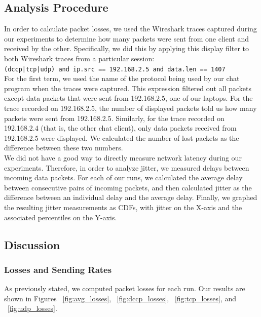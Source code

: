 \documentclass[9pt,twocolumn]{article}
\begin{document}
\subsection{Analysis Procedure}

In order to calculate packet losses, we used the Wireshark traces captured
during our experiments to determine how many packets were sent from one client
and received by the other. Specifically, we did this by applying this display
filter to both Wireshark traces from a particular session:\\

\texttt{(dccp|tcp|udp) and ip.src == 192.168.2.5 and data.len == 1407}\\

For the first term, we used the name of the protocol being used by our chat
program when the traces were captured. This expression filtered out all
packets except data packets that were sent from 192.168.2.5, one of our laptops.
For the trace recorded on 192.168.2.5, the number of displayed packets told us
how many packets were sent from 192.168.2.5.
Similarly, for the trace recorded on 192.168.2.4 (that is, the other chat
client), only data packets received from 192.168.2.5 were displayed. We
calculated the number of lost packets as the difference between these two
numbers.\\

We did not have a good way to directly measure network latency during our
experiments. Therefore, in order to analyze jitter, we measured delays between
incoming data packets. For each of our runs, we calculated the average delay
between consecutive pairs of incoming packets, and then calculated jitter as the
difference between an individual delay and the average delay. Finally, we
graphed the resulting jitter measurements as CDFs, with jitter on the X-axis and
the associated percentiles on the Y-axis.

\subsection{Discussion}

\subsubsection{Losses and Sending Rates}

As previously stated, we computed packet losses for each run. Our results are
shown in Figures ~\ref{fig:avg_losses}, ~\ref{fig:dccp_losses},
~\ref{fig:tcp_losses}, and ~\ref{fig:udp_losses}.\\
\end{document}
